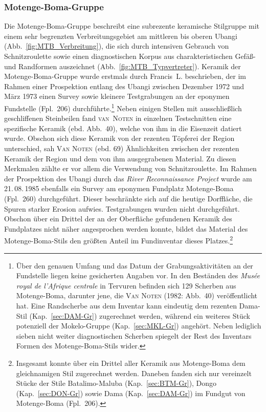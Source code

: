 \subsubsection{Motenge-Boma-Gruppe}\label{sec:MTB-Gr}

Die Motenge-Boma-Gruppe beschreibt eine subrezente keramische Stilgruppe mit einem sehr begrenzten Verbreitungsgebiet am mittleren bis oberen \mbox{Ubangi} (Abb.~\ref{fig:MTB_Verbreitung}), die sich durch intensiven Gebrauch von Schnitzroulette sowie einen diagnostischen Korpus aus charakteristischen Gefäß- und Randformen auszeichnet (Abb.~\ref{fig:MTB_Typvertreter}). Keramik der Motenge-Boma-Gruppe wurde erstmals durch Francis~L. \textcites[75]{vanNoten.1978}[69]{vanNoten.1982d} beschrieben, der im Rahmen einer Prospektion entlang des \mbox{Ubangi} zwischen Dezember 1972 und März 1973 einen Survey sowie kleinere Testgrabungen an der eponymen Fundstelle (Fpl.~206) durchführte.\footnote{Über den genauen Umfang und das Datum der Grabungsaktivitäten an der Fundstelle liegen keine gesicherten Angaben vor. In den Beständen des \textit{Musée royal de l’Afrique centrale} in Tervuren befinden sich 129 Scherben aus Motenge-Boma, darunter jene, die  \textsc{Van Noten} (1982: Abb.~40) veröffentlicht hat. Eine Randscherbe aus dem Inventar kann eindeutig dem rezenten Dama-Stil (Kap.~\ref{sec:DAM-Gr}) zugerechnet werden, während ein weiteres Stück potenziell der Mokelo-Gruppe (Kap.~\ref{sec:MKL-Gr}) angehört. Neben lediglich sieben nicht weiter diagnostischen Scherben spiegelt der Rest des Inventars Formen des Motenge-Boma-Stils wider.} Neben einigen Stellen mit ausschließlich geschliffenen Steinbeilen fand \textsc{van~Noten} in einzelnen Testschnitten eine spezifische Keramik (ebd. Abb.~40), welche von ihm in die Eisenzeit datiert wurde. Obschon sich diese Keramik von der rezenten Töpferei der Region unterschied, sah \textsc{Van Noten} (ebd. 69) Ähnlichkeiten zwischen der rezenten Keramik der Region und dem von ihm ausgegrabenen Material. Zu diesen Merkmalen zählte er vor allem die Verwendung von Schnitzroulette. Im Rahmen der Prospektion des \mbox{Ubangi} durch das \textit{River Reconnaissance Project} wurde am 21.\,08.\,1985 ebenfalls ein Survey am eponymen Fundplatz Motenge-Boma (Fpl.~260) durchgeführt. Dieser beschränkte sich auf die heutige Dorffläche, die Spuren starker Erosion aufwies. Testgrabungen wurden nicht durchgeführt. Obschon über ein Drittel der an der Oberfläche gefundenen Keramik des Fundplatzes nicht näher angesprochen werden konnte, bildet das Material des Motenge-Boma-Stils den größten Anteil im Fundinventar dieses Platzes.\footnote{Insgesamt konnte über ein Drittel aller Keramik aus Motenge-Boma dem gleichnamigen Stil zugerechnet werden. Daneben fanden sich nur vereinzelt Stücke der Stile Batalimo-Maluba (Kap.~\ref{sec:BTM-Gr}), Dongo (Kap.~\ref{sec:DON-Gr}) sowie Dama (Kap.~\ref{sec:DAM-Gr}) im Fundgut von Motenge-Boma (Fpl.~206).}

